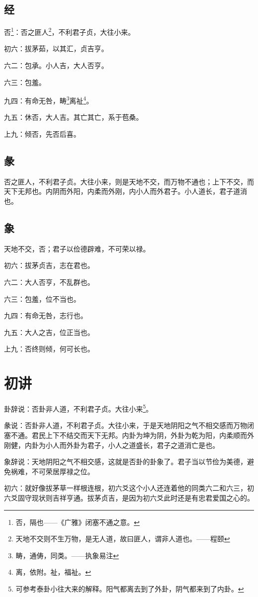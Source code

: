 \documentclass[12pt,oneside]{book}
\begin{document}
\subsection{经}
否\footnote{否，隔也——《广雅》闭塞不通之意。}：否之匪人\footnote{天地不交则不生万物，是无人道，故曰匪人，谓非人道也。——程颐}，不利君子贞，大往小来。

初六：拔茅茹，以其汇，贞吉亨。

六二：包承。小人吉，大人否亨。

六三：包羞。

九四：有命无咎，畴\footnote{畴，通俦，同类。——执象易注}离祉\footnote{离，依附。祉，福祉。}。

九五：休否，大人吉。其亡其亡，系于苞桑。

上九：倾否，先否后喜。

\subsection{彖}
否之匪人，不利君子贞。大往小来，则是天地不交，而万物不通也；上下不交，而天下无邦也。内阴而外阳，内柔而外刚，内小人而外君子。小人道长，君子道消也。

\subsection{象}
天地不交，否；君子以俭德辟难，不可荣以禄。

初六：拔茅贞吉，志在君也。

六二：大人否亨，不乱群也。

六三：包羞，位不当也。

九四：有命无咎，志行也。

九五：大人之吉，位正当也。

上九：否终则倾，何可长也。


\section{初讲}
卦辞说：否卦非人道，不利君子贞。大往小来\footnote{可参考泰卦小往大来的解释。阳气都离去到了外卦，阴气都来到了内卦。}。

彖说：否卦非人道，不利君子贞。大往小来，于是天地阴阳之气不相交感而万物闭塞不通。君民上下不结交而天下无邦。内卦为坤为阴，外卦为乾为阳，内柔顺而外刚健，内卦为小人而外卦为君子，小人之道盛长，君子之道消亡是也。

象辞说：天地阴阳之气不相交感，这就是否卦的卦象了。君子当以节俭为美德，避免祸难，不可荣居厚禄之位。

初六：就好像拔茅草一样根连根，初六爻这个小人还连着他的同类六二和六三，初六爻固守现状则吉祥亨通。拔茅贞吉，是因为初六爻此时还是有忠君爱国之心的。
\end{document}
